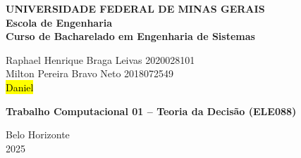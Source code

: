 \begin{center}
\textbf{UNIVERSIDADE FEDERAL DE MINAS GERAIS\\
Escola de Engenharia \\
Curso de Bacharelado em Engenharia de Sistemas}

\vspace{4cm}

Raphael Henrique Braga Leivas 2020028101 \\
Milton Pereira Bravo Neto 2018072549 \\
\hl{Daniel}

\vspace{4cm}  

{ \textbf{Trabalho Computacional 01 – Teoria da Decisão (ELE088)} }

\vfill
{Belo Horizonte \\
2025 }
\end{center}

\newpage